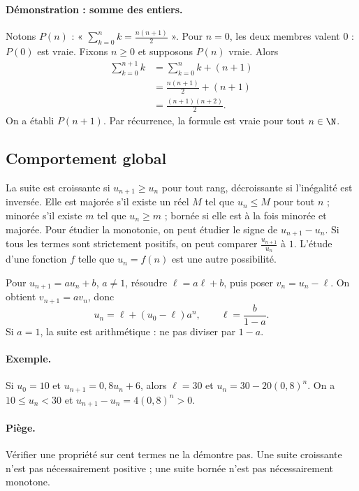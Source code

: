 \paragraph{Démonstration : somme des entiers.} Notons $P(n)$ : « $\sum_{k=0}^n k=\frac{n(n+1)}{2}$ ».
Pour $n=0$, les deux membres valent $0$ : $P(0)$ est vraie.
Fixons $n\ge0$ et supposons $P(n)$ vraie. Alors
\[\begin{aligned}\sum_{k=0}^{n+1}k&=\sum_{k=0}^nk+(n+1)\\&=\frac{n(n+1)}2+(n+1)\\&=\frac{(n+1)(n+2)}2.\end{aligned}\]
On a établi $P(n+1)$. Par récurrence, la formule est vraie pour tout $n\in\N$.
\subsection{Comportement global}
La suite est croissante si $u_{n+1}\ge u_n$ pour tout rang, décroissante si l'inégalité est inversée. Elle est majorée s'il existe un réel $M$ tel que $u_n\le M$ pour tout $n$ ; minorée s'il existe $m$ tel que $u_n\ge m$ ; bornée si elle est à la fois minorée et majorée.
Pour étudier la monotonie, on peut étudier le signe de $u_{n+1}-u_n$. Si tous les termes sont strictement positifs, on peut comparer $\frac{u_{n+1}}{u_n}$ à $1$. L'étude d'une fonction $f$ telle que $u_n=f(n)$ est une autre possibilité.
\begin{method}
Pour $u_{n+1}=au_n+b$, $a\ne1$, résoudre $\ell=a\ell+b$, puis poser $v_n=u_n-\ell$. On obtient $v_{n+1}=av_n$, donc
\[u_n=\ell+(u_0-\ell)a^n,\qquad\ell=\frac{b}{1-a}.\]
Si $a=1$, la suite est arithmétique : ne pas diviser par $1-a$.
\end{method}
\paragraph{Exemple.} Si $u_0=10$ et $u_{n+1}=0{,}8u_n+6$, alors $\ell=30$ et $u_n=30-20(0{,}8)^n$. On a $10\le u_n<30$ et $u_{n+1}-u_n=4(0{,}8)^n>0$.
\paragraph{Piège.} Vérifier une propriété sur cent termes ne la démontre pas. Une suite croissante n'est pas nécessairement positive ; une suite bornée n'est pas nécessairement monotone.


